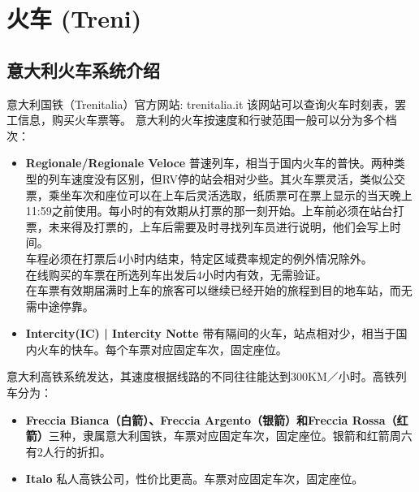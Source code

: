 \section{火车 (Treni)}

\subsection{意大利火车系统介绍}

意大利国铁（Trenitalia）官方网站: trenitalia.it 该网站可以查询火车时刻表，罢工信息，购买火车票等。
意大利的火车按速度和行驶范围一般可以分为多个档次：
\begin{itemize}
\item  \textbf{Regionale/Regionale Veloce} 普速列车，相当于国内火车的普快。两种类型的列车速度没有区别，但RV停的站会相对少些。其火车票灵活，类似公交票，乘坐车次和座位可以在上车后灵活选取，纸质票可在票上显示的当天晚上11:59之前使用。每小时的有效期从打票的那一刻开始。上车前必须在站台打票，未来得及打票的，上车后需要及时寻找列车员进行说明，他们会写上时间。\\
车程必须在打票后4小时内结束，特定区域费率规定的例外情况除外。\\
在线购买的车票在所选列车出发后4小时内有效，无需验证。\\
在车票有效期届满时上车的旅客可以继续已经开始的旅程到目的地车站，而无需中途停靠。
\item  \textbf{Intercity(IC) | Intercity Notte} 带有隔间的火车，站点相对少，相当于国内火车的快车。每个车票对应固定车次，固定座位。
\end{itemize}

意大利高铁系统发达，其速度根据线路的不同往往能达到300KM／小时。高铁列车分为：
\begin{itemize}
\item  \textbf{Freccia Bianca（白箭）、Freccia Argento（银箭）和Freccia Rossa（红箭）}三种，隶属意大利国铁，车票对应固定车次，固定座位。银箭和红箭周六有2人行的折扣。
\item  \textbf{Italo} 私人高铁公司，性价比更高。车票对应固定车次，固定座位。
\end{itemize}

